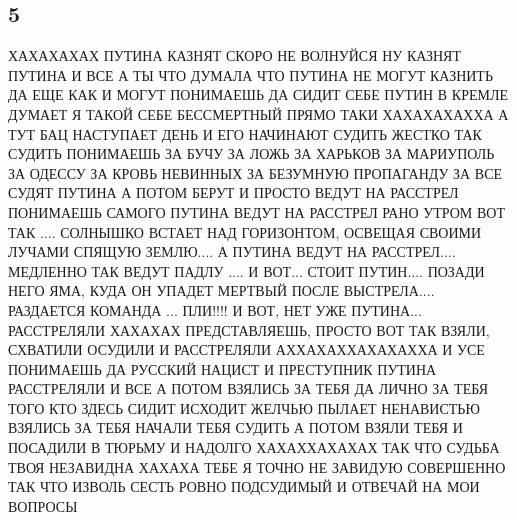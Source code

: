  
 
 
 
 

\subsection{5}

ХАХАХАХАХ ПУТИНА КАЗНЯТ СКОРО НЕ ВОЛНУЙСЯ НУ КАЗНЯТ ПУТИНА И ВСЕ А ТЫ ЧТО
ДУМАЛА ЧТО ПУТИНА НЕ МОГУТ КАЗНИТЬ ДА ЕЩЕ КАК И МОГУТ ПОНИМАЕШЬ ДА СИДИТ СЕБЕ
ПУТИН В КРЕМЛЕ ДУМАЕТ Я ТАКОЙ СЕБЕ БЕССМЕРТНЫЙ ПРЯМО ТАКИ ХАХАХАХАХХА А ТУТ БАЦ
НАСТУПАЕТ ДЕНЬ И ЕГО НАЧИНАЮТ СУДИТЬ ЖЕСТКО ТАК СУДИТЬ ПОНИМАЕШЬ ЗА БУЧУ ЗА
ЛОЖЬ ЗА ХАРЬКОВ ЗА МАРИУПОЛЬ ЗА ОДЕССУ ЗА КРОВЬ НЕВИННЫХ ЗА БЕЗУМНУЮ ПРОПАГАНДУ
ЗА ВСЕ СУДЯТ ПУТИНА А ПОТОМ БЕРУТ И ПРОСТО ВЕДУТ НА РАССТРЕЛ ПОНИМАЕШЬ САМОГО
ПУТИНА ВЕДУТ НА РАССТРЕЛ РАНО УТРОМ ВОТ ТАК .... СОЛНЫШКО ВСТАЕТ НАД
ГОРИЗОНТОМ, ОСВЕЩАЯ СВОИМИ ЛУЧАМИ СПЯЩУЮ ЗЕМЛЮ.... А ПУТИНА ВЕДУТ НА
РАССТРЕЛ.... МЕДЛЕННО ТАК ВЕДУТ ПАДЛУ .... И ВОТ... СТОИТ ПУТИН.... ПОЗАДИ НЕГО
ЯМА, КУДА ОН УПАДЕТ МЕРТВЫЙ ПОСЛЕ ВЫСТРЕЛА.... РАЗДАЕТСЯ КОМАНДА ... ПЛИ!!!! И
ВОТ, НЕТ УЖЕ ПУТИНА... РАССТРЕЛЯЛИ ХАХАХАХ ПРЕДСТАВЛЯЕШЬ, ПРОСТО ВОТ ТАК ВЗЯЛИ,
СХВАТИЛИ ОСУДИЛИ И РАССТРЕЛЯЛИ АХХАХАХХАХАХАХХА И УСЕ ПОНИМАЕШЬ ДА РУССКИЙ
НАЦИСТ И ПРЕСТУПНИК ПУТИНА РАССТРЕЛЯЛИ И ВСЕ А ПОТОМ ВЗЯЛИСЬ ЗА ТЕБЯ ДА ЛИЧНО
ЗА ТЕБЯ ТОГО КТО ЗДЕСЬ СИДИТ ИСХОДИТ ЖЕЛЧЬЮ ПЫЛАЕТ НЕНАВИСТЬЮ ВЗЯЛИСЬ ЗА ТЕБЯ
НАЧАЛИ ТЕБЯ СУДИТЬ А ПОТОМ ВЗЯЛИ ТЕБЯ И ПОСАДИЛИ В ТЮРЬМУ И НАДОЛГО
ХАХАХХАХАХАХ ТАК ЧТО СУДЬБА ТВОЯ НЕЗАВИДНА ХАХАХА ТЕБЕ Я ТОЧНО НЕ ЗАВИДУЮ
СОВЕРШЕННО ТАК ЧТО ИЗВОЛЬ СЕСТЬ РОВНО ПОДСУДИМЫЙ И ОТВЕЧАЙ НА МОИ ВОПРОСЫ
